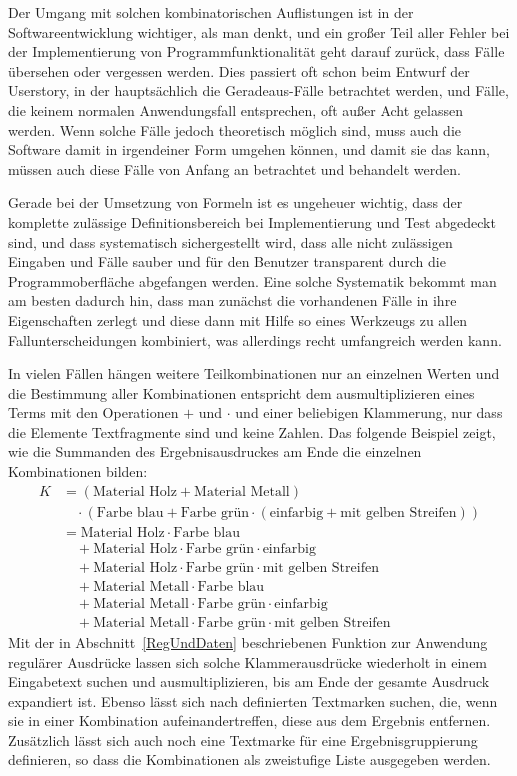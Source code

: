 Der Umgang mit solchen kombinatorischen Auf\-lis\-tungen ist in der Softwareentwicklung wichtiger, als man denkt, und ein großer Teil aller Fehler bei der Implementierung von Programmfunktionalität geht darauf zurück, dass Fälle übersehen oder vergessen werden. Dies passiert oft schon beim Entwurf der Userstory, in der hauptsächlich die Geradeaus-Fälle betrachtet werden, und Fälle, die keinem normalen Anwendungsfall entsprechen, oft außer Acht gelassen werden. Wenn solche Fälle jedoch theoretisch möglich sind, muss auch die Software damit in irgendeiner Form umgehen können, und damit sie das kann, müssen auch diese Fälle von Anfang an betrachtet und behandelt werden. 

Gerade bei der Umsetzung von Formeln ist es ungeheuer wichtig, dass der komplette zulässige Definitionsbereich bei Implementierung und Test abgedeckt sind, und dass systematisch sichergestellt wird, dass alle nicht zulässigen Eingaben und Fälle sauber und für den Benutzer transparent durch die Programmoberfläche abgefangen werden. Eine solche Systematik bekommt man am besten dadurch hin, dass man zunächst die vorhandenen Fälle in ihre Eigenschaften zerlegt und diese dann mit Hilfe so eines Werkzeugs zu allen Fallunterscheidungen kombiniert, was allerdings recht umfangreich werden kann. 

In vielen Fällen hängen weitere Teilkombinationen nur an einzelnen Werten und die Bestimmung aller Kombinationen entspricht dem ausmultiplizieren eines Terms mit  den Operationen $+$ und $\cdot$ und einer beliebigen Klammerung, nur dass die Elemente Textfragmente sind und keine Zahlen. Das folgende Beispiel zeigt, wie die Summanden des Ergebnisausdruckes am Ende die einzelnen Kombinationen bilden:
\[
\begin{split}
K &= (\text{Material Holz} + \text{Material Metall})\\
    &\quad\cdot (\text{Farbe blau} + \text{Farbe grün}\cdot (\text{einfarbig} + \text{mit gelben Streifen}))\\
&= \text{Material Holz}\cdot\text{Farbe blau}\\
&\quad+ \text{Material Holz}\cdot\text{Farbe grün}\cdot\text{einfarbig}\\
&\quad+ \text{Material Holz}\cdot\text{Farbe grün}\cdot\text{mit gelben Streifen}\\
&\quad+ \text{Material Metall}\cdot\text{Farbe blau}\\
&\quad+ \text{Material Metall}\cdot\text{Farbe grün}\cdot\text{einfarbig}\\
&\quad+ \text{Material Metall}\cdot\text{Farbe grün}\cdot\text{mit gelben Streifen}
\end{split}
\]
Mit der in Abschnitt~\ref{RegUndDaten} beschriebenen Funktion zur Anwendung regulärer Ausdrücke lassen sich solche Klammerausdrücke wiederholt in einem Eingabetext suchen und ausmultiplizieren, bis am Ende der gesamte Ausdruck expandiert ist. Ebenso lässt sich nach definierten Textmarken suchen, die, wenn sie in einer Kombination aufeinandertreffen, diese aus dem Ergebnis entfernen. Zusätzlich lässt sich auch noch eine Textmarke für eine Ergebnisgruppierung definieren, so dass die Kombinationen als zweistufige Liste ausgegeben werden.


